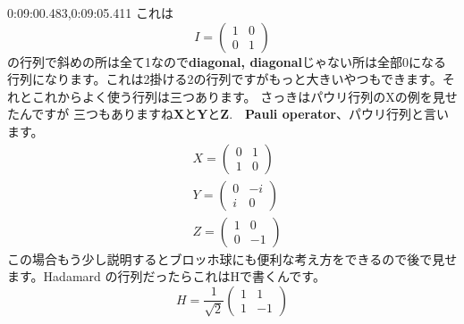 0:09:00.483,0:09:05.411
これは
\begin{equation}
I=\left(\begin{array}{ll}
1 & 0 \\
0 & 1
\end{array}\right)
\end{equation}
の行列で斜めの所は全て1なので\textbf{diagonal, diagonal}じゃない所は全部0になる行列になります。これは2掛ける2の行列ですがもっと大きいやつもできます。それとこれからよく使う行列は三つあります。
さっきはパウリ行列のXの例を見せたんですが
三つもありますね\textbf{X}と\textbf{Y}と\textbf{Z}.　\textbf{Pauli operator}、パウリ行列と言います。
\begin{equation}
\begin{aligned}
&X=\left(\begin{array}{ll}
0 & 1 \\
1 & 0
\end{array}\right) \\
&Y=\left(\begin{array}{cc}
0 & -i \\
i & 0
\end{array}\right) \\
&Z=\left(\begin{array}{cc}
1 & 0 \\
0 & -1
\end{array}\right)
\end{aligned}
\end{equation}
この場合もう少し説明するとブロッホ球にも便利な考え方をできるので後で見せます。Hadamard の行列だったらこれはHで書くんです。
\begin{equation}
H=\frac{1}{\sqrt{2}}\left(\begin{array}{cc}
1 & 1 \\
1 & -1
\end{array}\right)
\end{equation}
